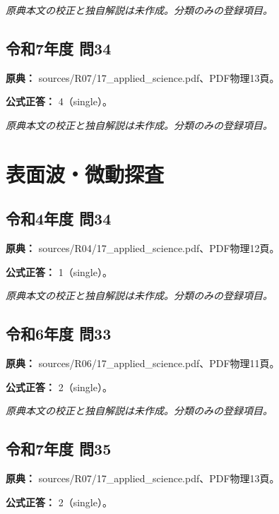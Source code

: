 \par\textit{原典本文の校正と独自解説は未作成。分類のみの登録項目。}

\subsection{令和7年度 問34}
\label{q:r07-reg-applied-34}

\noindent\textbf{原典：} sources/R07/17\_applied\_science.pdf、PDF物理13頁。

\textbf{公式正答：} 4（single）。

\par\textit{原典本文の校正と独自解説は未作成。分類のみの登録項目。}

\section{表面波・微動探査}

\subsection{令和4年度 問34}
\label{q:r04-reg-applied-34}

\noindent\textbf{原典：} sources/R04/17\_applied\_science.pdf、PDF物理12頁。

\textbf{公式正答：} 1（single）。

\par\textit{原典本文の校正と独自解説は未作成。分類のみの登録項目。}

\subsection{令和6年度 問33}
\label{q:r06-reg-applied-33}

\noindent\textbf{原典：} sources/R06/17\_applied\_science.pdf、PDF物理11頁。

\textbf{公式正答：} 2（single）。

\par\textit{原典本文の校正と独自解説は未作成。分類のみの登録項目。}

\subsection{令和7年度 問35}
\label{q:r07-reg-applied-35}

\noindent\textbf{原典：} sources/R07/17\_applied\_science.pdf、PDF物理13頁。

\textbf{公式正答：} 2（single）。

